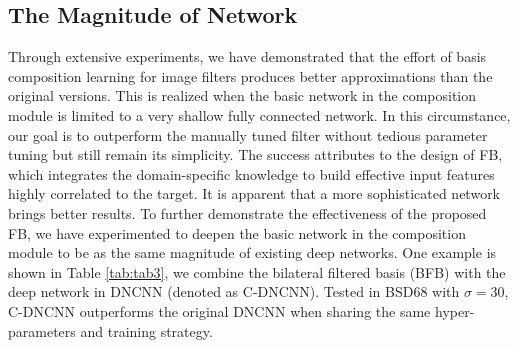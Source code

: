 \documentclass[twocolumn]{svjour3}          %
\begin{document}
\begin{table}[h]
	\small
\end{table}

\begin{table}[h]
	\footnotesize
\end{table}	


 	\subsection{The Magnitude of Network} \label{sec5.2}
 Through extensive experiments, we have demonstrated that the effort of basis composition learning for image filters produces better approximations than the original versions. This is realized when the basic network in the composition module is limited to a very shallow fully connected network. In this circumstance, our goal is to outperform the manually tuned filter without tedious parameter tuning but still remain its simplicity. The success attributes to the design of FB, which integrates the domain-specific knowledge to build effective input features highly correlated to the target. It is apparent that a more sophisticated network brings better results. To further demonstrate the effectiveness of the proposed FB, we have experimented to deepen the basic network in the composition module to be as the same magnitude of existing deep networks. One example is shown in Table \ref{tab:tab3}, we combine the bilateral filtered basis (BFB) with the deep network in DNCNN \cite{dncnn} (denoted as C-DNCNN). Tested in BSD68 with $\sigma = 30$, C-DNCNN outperforms the original DNCNN when sharing the same hyper-parameters and training strategy.
\end{document}
